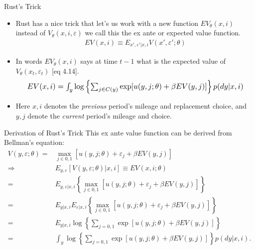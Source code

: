 \documentclass[xcolor=pdftex,dvipsnames,table,mathserif,aspectratio=169]{beamer}
\begin{document}
\begin{frame}{Rust's Trick}\

\begin{itemize}
\item Rust has a nice trick that let's us work with a new function $EV_{\theta}(x,i)$ instead of $V_{\theta}(x,i,\varepsilon)$ we call this the \alert{ex ante} or \alert{expected value function}.
\begin{eqnarray*}
EV(x, i) \equiv E_{x', \varepsilon ' | x, i} V(x', \varepsilon ' ; \theta)
\end{eqnarray*}
\item In words $EV_{\theta}(x,i)$ says at time $t-1$ what is the expected value of $V_{\theta}(x_t,\varepsilon_t)$ [eq 4.14].
\begin{eqnarray*}
\resizebox{.9\hsize}{!}{$EV(x,i) = \int_y \log \left \{ \sum_{j \in C(y)} \exp [ u(y,j; \theta) + \beta EV(y, j)] \right \} p(dy|x,i) $}
\end{eqnarray*}
\item Here $x, i$ denotes the \emph{previous} period's mileage and replacement choice, and $y, j$ denote the \emph{current} period's mileage and choice. 
\end{itemize}
\end{frame}

\begin{frame}{Derivation of Rust's Trick}
This \alert{ex ante value function} can be derived from Bellman's equation:
\begin{equation*}
\begin{split}
V(y, \varepsilon ;\theta) = & \max_{j \in 0,1} [ u(y, j ; \theta) + \varepsilon_j + \beta EV(y,j)] \\
\Longrightarrow & E_{y, \varepsilon} [V(y, \varepsilon ; \theta) | x, i ] \equiv  EV(x, i ; \theta) \\
= & E_{y, \varepsilon | x, i } \left \{ \max_{ j \in 0,1} [ u(y, j ; \theta) + \varepsilon_j + \beta EV(y,j)] \right \} \\
= &  E_{y | x, i }  E_{\varepsilon | x, i } \left \{ \max_{ j \in 0,1} [ u(y, j ; \theta) + \varepsilon_j + \beta EV(y,j)] \right \} \\
= &  E_{y | x, i } \log \left \{ \sum_{j=0,1} \exp [ u(y, j ; \theta)  + \beta EV(y,j)] \right \} \\
= & \int_y \log  \left \{ \sum_{j=0,1} \exp [ u(y, j ; \theta)  + \beta EV(y,j)] \right \} p(dy|x,i).
\end{split}
\end{equation*}
\end{frame}
%
\end{document}
